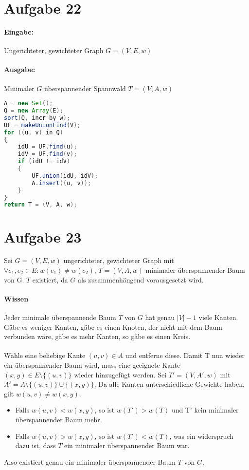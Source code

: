 \documentclass[10pt,a4paper]{article}
\begin{document}
\section*{Aufgabe 22}
	\paragraph{Eingabe:} Ungerichteter, gewichteter Graph $G=(V, E, w)$
	\paragraph{Ausgabe:} Minimaler $G$ überspannender Spannwald $T=(V, A, w)$
	\begin{lstlisting}[language=Java]
A = new Set();
Q = new Array(E);
sort(Q, incr by w);
UF = makeUnionFind(V);
for ((u, v) in Q)
{
	idU = UF.find(u);
	idV = UF.find(v);
	if (idU != idV)
	{
		UF.union(idU, idV);
		A.insert((u, v));
	}
}
return T = (V, A, w);
	\end{lstlisting}


\section*{Aufgabe 23}
Sei $G = (V, E, w)$ ungerichteter, gewichteter Graph mit $\forall e_1, e_2 \in E : w(e_1) \neq w(e_2)$, $T = (V, A, w)$ minimaler überspannender Baum von G. $T$ existiert, da $G$ als zusammenhängend vorausgesetzt wird.
\paragraph{Wissen} Jeder minimale überspannende Baum $T$ von $G$ hat genau $|V|-1$ viele Kanten. Gäbe es weniger Kanten, gäbe es einen Knoten, der nicht mit dem Baum verbunden wäre, gäbe es mehr Kanten, so gäbe es einen Kreis.
\paragraph{}
Wähle eine beliebige Kante $(u, v) \in A$ und entferne diese. Damit T nun wieder ein überspannender Baum wird, muss eine geeignete Kante $(x, y) \in E \setminus \{(u,v)\}$ wieder hinzugefügt werden.
Sei $T' = (V, A', w)$ mit $A' = A \setminus \{(u,v)\} \cup \{(x,y)\}$.
Da alle Kanten unterschiedliche Gewichte haben, gilt $w(u,v) \neq w(x, y)$.
\begin{itemize}
	\item Falls $w(u, v) < w(x, y)$, so ist $w(T') > w(T)$ und T' kein minimaler überspannender Baum mehr.
	\item Falls $w(u, v) > w(x, y)$, so ist $w(T') < w(T)$, was ein widerspruch dazu ist, dass $T$ ein minimaler überspannender Baum war.
\end{itemize}

Also existiert genau ein minimaler überspannender Baum $T$ von $G$.
\end{document}
